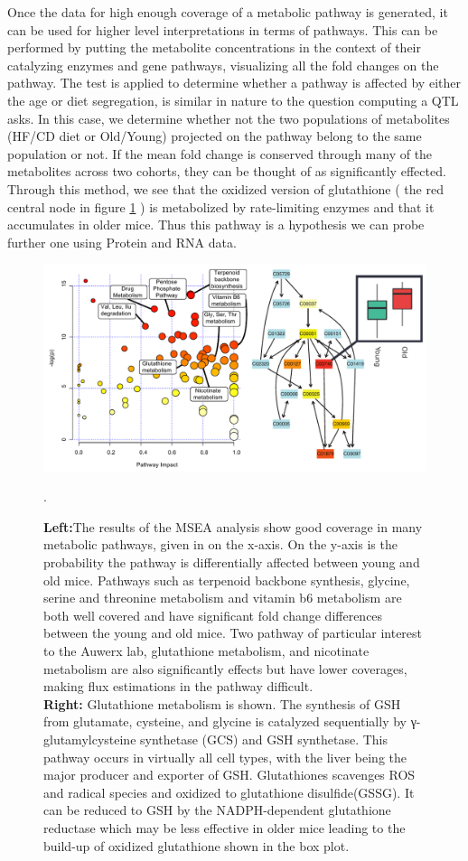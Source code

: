 \documentclass[a4paper,11pt,twoside]{book}
\begin{document}
	Once the data for high enough coverage of a metabolic pathway is generated, it can be used for higher level interpretations in terms of pathways. This can be performed by putting the metabolite concentrations in the context of their catalyzing enzymes and gene pathways, visualizing all the fold changes on the pathway. The test is applied to determine whether a pathway is affected by either the age or diet segregation, is similar in nature to the question computing a QTL asks. In this case, we determine whether not the two populations of metabolites (HF/CD diet or Old/Young) projected on the pathway belong to the same population or not. If the mean fold change is conserved through many of the metabolites across two cohorts, they can be thought of as significantly effected\citep{Wishart2013}. Through this method, we see that the oxidized version of glutathione ( the red central node in figure \ref{fig:MSEA} ) is metabolized by rate-limiting enzymes and that it accumulates in older mice.  Thus this pathway is a hypothesis we can probe further one using Protein and RNA data.
	
	\begin{figure}
				\centering
		\includegraphics[width=0.99\linewidth]{3.Metabolomics/MSEA}
		\caption{\textbf{Left:}The results of the MSEA analysis show good coverage in many metabolic pathways, given in on the x-axis. On the y-axis is the probability the pathway is differentially affected between young and old mice. Pathways such as terpenoid backbone synthesis, glycine, serine and threonine metabolism and vitamin b6 metabolism are both well covered and have significant fold change differences between the young and old mice. Two pathway of particular interest to the Auwerx lab, glutathione metabolism, and nicotinate metabolism are also significantly effects but have lower coverages, making flux estimations in the pathway difficult. \\ \textbf{Right:} Glutathione metabolism is shown. The synthesis of GSH from glutamate, cysteine, and glycine is catalyzed sequentially by γ-glutamylcysteine synthetase (GCS) and GSH synthetase. This pathway occurs in virtually all cell types, with the liver being the major producer and exporter of GSH. Glutathiones scavenges ROS and radical species and oxidized to glutathione disulfide(GSSG). It can be reduced to GSH by the NADPH-dependent glutathione reductase which may be less effective in older mice leading to the build-up of oxidized glutathione shown in the box plot. \citep{Wu2004Glutathione}}. 
		\label{fig:MSEA}
	\end{figure}
	
\end{document}
